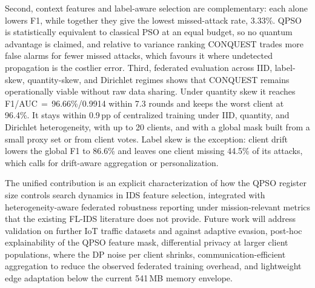 \documentclass[conference]{IEEEtran}
\begin{document}
Second, context features and label-aware
selection are complementary: each alone lowers F1, while together
they give the lowest missed-attack rate, 3.33\%. QPSO is
statistically equivalent to classical PSO at an equal budget, so
no quantum advantage is claimed, and relative to variance ranking
CONQUEST trades more false alarms for fewer missed attacks, which
favours it where undetected propagation is the costlier error.
Third, federated evaluation across IID, label-skew,
quantity-skew, and Dirichlet regimes shows that CONQUEST
remains operationally viable without raw data sharing.
Under quantity skew it reaches F1/AUC\,$=$\,96.66\%/0.9914
within 7.3 rounds and keeps the worst client at 96.4\%. It stays
within 0.9\,pp of centralized training under IID, quantity, and
Dirichlet heterogeneity, with up to 20 clients, and with a global
mask built from a small proxy set or from client votes. Label skew is the exception: client drift lowers the global
F1 to 86.6\% and leaves one client missing 44.5\% of its attacks,
which calls for drift-aware aggregation or personalization.

The unified contribution is an explicit
characterization of how the QPSO register size controls search
dynamics in IDS feature selection, integrated with heterogeneity-aware
federated robustness reporting under mission-relevant
metrics that the existing FL-IDS literature does not provide.
Future work will address validation on further IoT traffic datasets
and against adaptive evasion, post-hoc
explainability of the QPSO feature mask, differential privacy at
larger client populations, where the DP noise per client shrinks, communication-efficient aggregation to
reduce the observed federated
training overhead, and lightweight edge adaptation below
the current 541\,MB memory envelope.
\end{document}
